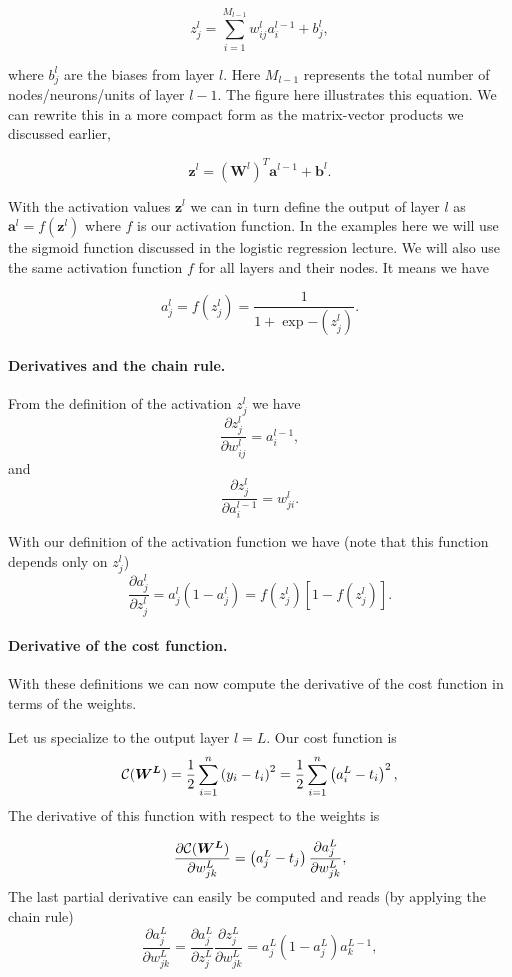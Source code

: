 \documentclass[%
oneside,                 %
final,                   %
10pt]{article}
\begin{document}
\[
z_j^l = \sum_{i=1}^{M_{l-1}}w_{ij}^la_i^{l-1}+b_j^l,
\]

where $b_j^l$ are the biases from layer $l$.  Here $M_{l-1}$
represents the total number of nodes/neurons/units of layer $l-1$. The
figure here illustrates this equation.  We can rewrite this in a more
compact form as the matrix-vector products we discussed earlier,

\[
\boldsymbol{z}^l = \left(\boldsymbol{W}^l\right)^T\boldsymbol{a}^{l-1}+\boldsymbol{b}^l.
\]

With the activation values $\boldsymbol{z}^l$ we can in turn define the
output of layer $l$ as $\boldsymbol{a}^l = f(\boldsymbol{z}^l)$ where $f$ is our
activation function. In the examples here we will use the sigmoid
function discussed in the logistic regression lecture. We will also use the same activation function $f$ for all layers
and their nodes.  It means we have

\[
a_j^l = f(z_j^l) = \frac{1}{1+\exp{-(z_j^l)}}.
\]


\paragraph{Derivatives and the chain rule.}
From the definition of the activation $z_j^l$ we have
\[
\frac{\partial z_j^l}{\partial w_{ij}^l} = a_i^{l-1},
\]
and
\[
\frac{\partial z_j^l}{\partial a_i^{l-1}} = w_{ji}^l. 
\]

With our definition of the activation function we have (note that this function depends only on $z_j^l$)
\[
\frac{\partial a_j^l}{\partial z_j^{l}} = a_j^l(1-a_j^l)=f(z_j^l) \left[ 1-f(z_j^l) \right]. 
\]


\paragraph{Derivative of the cost function.}
With these definitions we can now compute the derivative of the cost function in terms of the weights.

Let us specialize to the output layer $l=L$. Our cost function is
\[
{\cal C}(\boldsymbol{W^L})  =  \frac{1}{2}\sum_{i=1}^n\left(y_i - t_i\right)^2=\frac{1}{2}\sum_{i=1}^n\left(a_i^L - t_i\right)^2, 
\]
The derivative of this function with respect to the weights is

\[
\frac{\partial{\cal C}(\boldsymbol{W^L})}{\partial w_{jk}^L}  =  \left(a_j^L - t_j\right)\frac{\partial a_j^L}{\partial w_{jk}^{L}}, 
\]
The last partial derivative can easily be computed and reads (by applying the chain rule)
\[
\frac{\partial a_j^L}{\partial w_{jk}^{L}} = \frac{\partial a_j^L}{\partial z_{j}^{L}}\frac{\partial z_j^L}{\partial w_{jk}^{L}}=a_j^L(1-a_j^L)a_k^{L-1},  
\]
\end{document}
